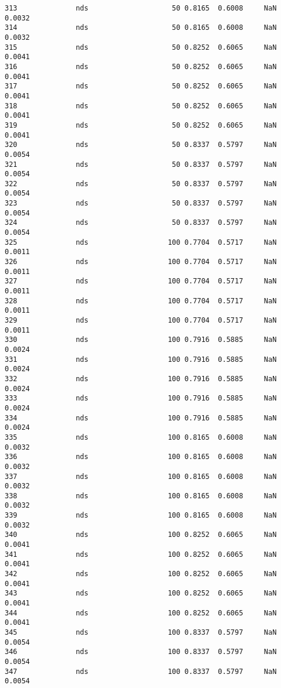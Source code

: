 \documentclass[11pt]{article}
\begin{document}
\begin{Verbatim}[commandchars=\\\{\}]
313              nds                    50 0.8165  0.6008     NaN 0.0032   
314              nds                    50 0.8165  0.6008     NaN 0.0032   
315              nds                    50 0.8252  0.6065     NaN 0.0041   
316              nds                    50 0.8252  0.6065     NaN 0.0041   
317              nds                    50 0.8252  0.6065     NaN 0.0041   
318              nds                    50 0.8252  0.6065     NaN 0.0041   
319              nds                    50 0.8252  0.6065     NaN 0.0041   
320              nds                    50 0.8337  0.5797     NaN 0.0054   
321              nds                    50 0.8337  0.5797     NaN 0.0054   
322              nds                    50 0.8337  0.5797     NaN 0.0054   
323              nds                    50 0.8337  0.5797     NaN 0.0054   
324              nds                    50 0.8337  0.5797     NaN 0.0054   
325              nds                   100 0.7704  0.5717     NaN 0.0011   
326              nds                   100 0.7704  0.5717     NaN 0.0011   
327              nds                   100 0.7704  0.5717     NaN 0.0011   
328              nds                   100 0.7704  0.5717     NaN 0.0011   
329              nds                   100 0.7704  0.5717     NaN 0.0011   
330              nds                   100 0.7916  0.5885     NaN 0.0024   
331              nds                   100 0.7916  0.5885     NaN 0.0024   
332              nds                   100 0.7916  0.5885     NaN 0.0024   
333              nds                   100 0.7916  0.5885     NaN 0.0024   
334              nds                   100 0.7916  0.5885     NaN 0.0024   
335              nds                   100 0.8165  0.6008     NaN 0.0032   
336              nds                   100 0.8165  0.6008     NaN 0.0032   
337              nds                   100 0.8165  0.6008     NaN 0.0032   
338              nds                   100 0.8165  0.6008     NaN 0.0032   
339              nds                   100 0.8165  0.6008     NaN 0.0032   
340              nds                   100 0.8252  0.6065     NaN 0.0041   
341              nds                   100 0.8252  0.6065     NaN 0.0041   
342              nds                   100 0.8252  0.6065     NaN 0.0041   
343              nds                   100 0.8252  0.6065     NaN 0.0041   
344              nds                   100 0.8252  0.6065     NaN 0.0041   
345              nds                   100 0.8337  0.5797     NaN 0.0054   
346              nds                   100 0.8337  0.5797     NaN 0.0054   
347              nds                   100 0.8337  0.5797     NaN 0.0054   

\end{Verbatim}
\end{document}
